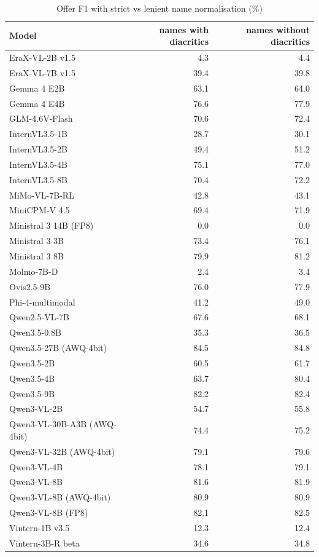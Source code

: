\begin{table}[t]
\centering
\caption{Offer F1 with strict vs lenient name normalisation (\%)}
\label{tab:namemodes}
\small
\begin{tabular}{lrr}
\toprule
Model & names with diacritics & names without diacritics \\
\midrule
EraX-VL-2B v1.5 & 4.3 & 4.4 \\
EraX-VL-7B v1.5 & 39.4 & 39.8 \\
Gemma 4 E2B & 63.1 & 64.0 \\
Gemma 4 E4B & 76.6 & 77.9 \\
GLM-4.6V-Flash & 70.6 & 72.4 \\
InternVL3.5-1B & 28.7 & 30.1 \\
InternVL3.5-2B & 49.4 & 51.2 \\
InternVL3.5-4B & 75.1 & 77.0 \\
InternVL3.5-8B & 70.4 & 72.2 \\
MiMo-VL-7B-RL & 42.8 & 43.1 \\
MiniCPM-V 4.5 & 69.4 & 71.9 \\
Ministral 3 14B (FP8) & 0.0 & 0.0 \\
Ministral 3 3B & 73.4 & 76.1 \\
Ministral 3 8B & 79.9 & 81.2 \\
Molmo-7B-D & 2.4 & 3.4 \\
Ovis2.5-9B & 76.0 & 77.9 \\
Phi-4-multimodal & 41.2 & 49.0 \\
Qwen2.5-VL-7B & 67.6 & 68.1 \\
Qwen3.5-0.8B & 35.3 & 36.5 \\
Qwen3.5-27B (AWQ-4bit) & 84.5 & 84.8 \\
Qwen3.5-2B & 60.5 & 61.7 \\
Qwen3.5-4B & 63.7 & 80.4 \\
Qwen3.5-9B & 82.2 & 82.4 \\
Qwen3-VL-2B & 54.7 & 55.8 \\
Qwen3-VL-30B-A3B (AWQ-4bit) & 74.4 & 75.2 \\
Qwen3-VL-32B (AWQ-4bit) & 79.1 & 79.6 \\
Qwen3-VL-4B & 78.1 & 79.1 \\
Qwen3-VL-8B & 81.6 & 81.9 \\
Qwen3-VL-8B (AWQ-4bit) & 80.9 & 80.9 \\
Qwen3-VL-8B (FP8) & 82.1 & 82.5 \\
Vintern-1B v3.5 & 12.3 & 12.4 \\
Vintern-3B-R beta & 34.6 & 34.8 \\
\bottomrule
\end{tabular}
\end{table}
